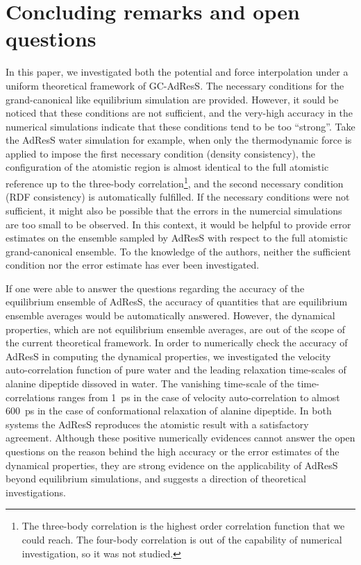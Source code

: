 \documentclass[epjST]{svjour}
\begin{document}




\section{Concluding remarks and open questions}
\label{sec:conclusion}

In this paper, we investigated both the potential and force
interpolation under a uniform theoretical framework of GC-AdResS. The
necessary conditions for the grand-canonical like equilibrium
simulation are provided. However, it sould be noticed that these
conditions are not sufficient, and the very-high accuracy in the  numerical simulations indicate
that these conditions tend to be too ``strong''.  Take the AdResS
water simulation for example, when only the thermodynamic force is
applied to impose the first necessary condition (density consistency),
the configuration of the atomistic region is almost identical to the
full atomistic reference up to the three-body
correlation\footnote{
  The three-body correlation is the highest order correlation function that we could reach.
  The four-body correlation is out of the capability of numerical
investigation, so it was not studied.}, and the second necessary condition (RDF consistency)
is automatically fulfilled.  If the necessary conditions were not
sufficient, it might also be possible that the errors in the numercial simulations are too
small to be observed.  In this context, it would be helpful
to provide error estimates on the ensemble  sampled by AdResS with respect to the full atomistic
grand-canonical ensemble.
To the knowledge of the authors,
neither the sufficient condition nor the error estimate has ever been investigated.

If one were able to answer the questions regarding the accuracy of the equilibrium
ensemble of AdResS, the accuracy of quantities that are equilibrium ensemble
averages would be automatically answered. However, the dynamical properties, which are
not equilibrium ensemble averages, are out of the scope of the current
theoretical framework. In order to numerically check the accuracy of AdResS
in computing the dynamical properties, we investigated the velocity auto-correlation
function of pure water and the leading relaxation time-scales of alanine dipeptide
dissoved in water.
The vanishing time-scale of the time-correlations ranges from 1~ps in the case of velocity auto-correlation
to almost 600~ps in the case of conformational relaxation of alanine dipeptide.
In both systems the AdResS reproduces the atomistic result
with a satisfactory agreement.
Although these positive numerically evidences cannot answer the open questions
on the reason behind the high accuracy or the error estimates of the dynamical properties,
they are strong evidence on the applicability of AdResS beyond equilibrium simulations,
and suggests a direction of theoretical investigations.
\end{document}
